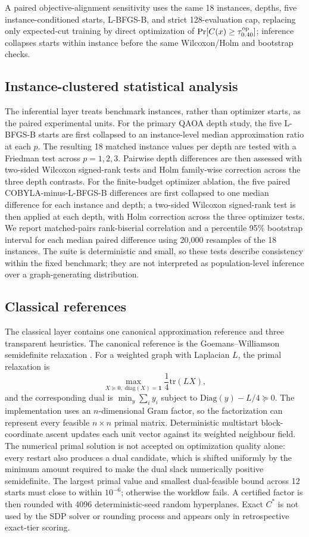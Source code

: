 \documentclass[5p,times]{elsarticle}
\begin{document}
A paired objective-alignment sensitivity uses the same 18 instances, depths, five instance-conditioned starts, L-BFGS-B, and strict 128-evaluation cap, replacing only expected-cut training by direct optimization of $\Pr[C(x)\geq\tau_{0.40}^{\rm op}]$; inference collapses starts within instance before the same Wilcoxon/Holm and bootstrap checks.

\subsection{Instance-clustered statistical analysis}
The inferential layer treats benchmark instances, rather than optimizer starts, as the paired experimental units. For the primary QAOA depth study, the five L-BFGS-B starts are first collapsed to an instance-level median approximation ratio at each $p$. The resulting 18 matched instance values per depth are tested with a Friedman test across $p=1,2,3$. Pairwise depth differences are then assessed with two-sided Wilcoxon signed-rank tests and Holm family-wise correction across the three depth contrasts. For the finite-budget optimizer ablation, the five paired COBYLA-minus-L-BFGS-B differences are first collapsed to one median difference for each instance and depth; a two-sided Wilcoxon signed-rank test is then applied at each depth, with Holm correction across the three optimizer tests. We report matched-pairs rank-biserial correlation and a percentile 95\% bootstrap interval for each median paired difference using 20,000 resamples of the 18 instances. The suite is deterministic and small, so these tests describe consistency within the fixed benchmark; they are not interpreted as population-level inference over a graph-generating distribution.

\subsection{Classical references}
The classical layer contains one canonical approximation reference and three transparent heuristics. The canonical reference is the Goemans--Williamson semidefinite relaxation \cite{goemans1995}. For a weighted graph with Laplacian $L$, the primal relaxation is
\begin{equation}
\max_{X\succeq0,\;\mathrm{diag}(X)=\mathbf{1}}\frac14\mathrm{tr}(LX),
\end{equation}
and the corresponding dual is $\min_y\sum_i y_i$ subject to $\mathrm{Diag}(y)-L/4\succeq0$. The implementation uses an $n$-dimensional Gram factor, so the factorization can represent every feasible $n\times n$ primal matrix. Deterministic multistart block-coordinate ascent updates each unit vector against its weighted neighbour field. The numerical primal solution is not accepted on optimization quality alone: every restart also produces a dual candidate, which is shifted uniformly by the minimum amount required to make the dual slack numerically positive semidefinite. The largest primal value and smallest dual-feasible bound across 12 starts must close to within $10^{-6}$; otherwise the workflow fails. A certified factor is then rounded with 4096 deterministic-seed random hyperplanes. Exact $C^*$ is not used by the SDP solver or rounding process and appears only in retrospective exact-tier scoring.
\end{document}
